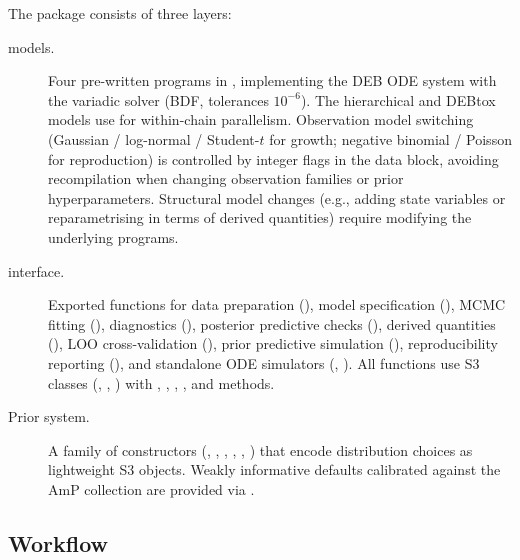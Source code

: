 \documentclass[article,shortnames]{jss}
\begin{document}
The package consists of three layers:
\begin{description}
  \item[ models.] Four pre-written  programs
    in , implementing the DEB ODE system with
    the variadic  solver (BDF, tolerances
    $10^{-6}$).  The hierarchical and DEBtox models use
     for within-chain parallelism.  Observation model
    switching (Gaussian / log-normal / Student-$t$ for growth; negative
    binomial / Poisson for reproduction) is controlled by integer flags
    in the  data block, avoiding recompilation when
    changing observation families or prior hyperparameters.
    Structural model changes (e.g., adding state variables or
    reparametrising in terms of derived quantities) require
    modifying the underlying  programs.
  \item[ interface.] Exported functions for data
    preparation (), model specification
    (), MCMC fitting (), diagnostics
    (), posterior predictive checks
    (), derived quantities (), LOO
    cross-validation (), prior predictive simulation
    (), reproducibility reporting
    (), and standalone ODE simulators
    (, ).  All
    functions use S3 classes (, ,
    ) with , , ,
    , and  methods.
  \item[Prior system.] A family of  constructors
    (, ,
    , ,
    , ) that encode
    distribution choices as lightweight S3 objects.  Weakly informative
    defaults calibrated against the AmP collection
    \citep{MarquesAmP2018} are provided via .
\end{description}

\subsection{Workflow} \label{sec:workflow}
\end{document}
